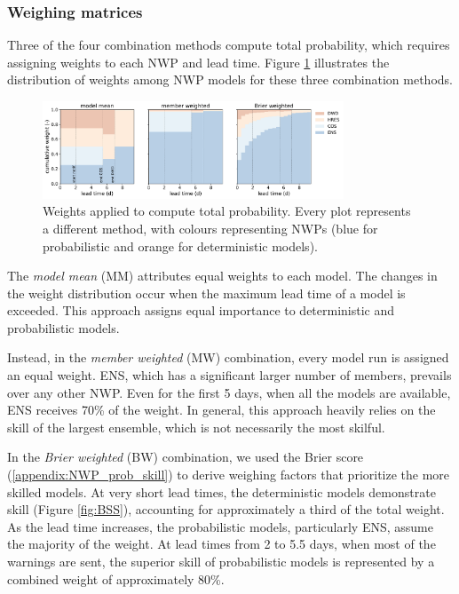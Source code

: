 \documentclass{ametsocV6.1}
\begin{document}
\subsubsection{Weighing matrices}
\label{sec:weights}

Three of the four combination methods compute total probability, which requires assigning weights to each NWP and lead time. Figure \ref{fig:weights} illustrates the distribution of weights among NWP models for these three combination methods.

\begin{figure}
    \centering
    \includegraphics[width=0.8\textwidth]{figure04.pdf}
    \caption{Weights applied to compute total probability. Every plot represents a different method, with colours representing NWPs (blue for probabilistic and orange for deterministic models).}
    \label{fig:weights}
\end{figure}

The \textit{model mean} (MM) attributes equal weights to each model. The changes in the weight distribution occur when the maximum lead time of a model is exceeded. This  approach assigns equal importance to deterministic and probabilistic models.

Instead, in the \textit{member weighted} (MW) combination, every model run is assigned an equal weight. ENS, which has a significant larger number of members, prevails over any other NWP. Even for the first 5 days, when all the models are available, ENS receives 70\% of the weight. In general, this approach heavily relies on the skill of the largest ensemble, which is not necessarily the most skilful.

In the \textit{Brier weighted} (BW) combination, we used the Brier score (\ref{appendix:NWP_prob_skill}) to derive weighing factors that prioritize the more skilled models. At very short lead times, the deterministic models demonstrate skill (Figure \ref{fig:BSS}), accounting for approximately a third of the total weight. As the lead time increases, the probabilistic models, particularly ENS, assume the majority of the weight. At lead times from 2 to 5.5 days, when most of the warnings are sent, the superior skill of probabilistic models is represented by a combined weight of approximately 80\%.
\end{document}

